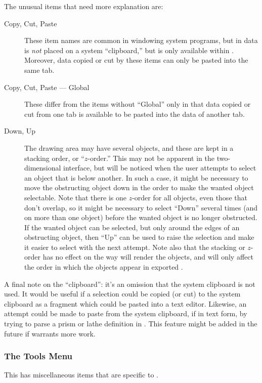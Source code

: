 			The unusual items that need more explanation are:
			\begin{description}
			  \item[Copy, Cut, Paste] These item names are common
			  in windowing system programs, but in \IXpkg{} data
			  is \emph{not} placed on a system ``clipboard,'' but
			  is only available within \IXpkg. Moreover, data
			  copied or cut by these items can only be pasted into
			  the same tab.
			  \item[Copy, Cut, Paste --- Global] These differ from
			  the items without ``Global'' only in that data
			  copied or cut from one tab is available to be pasted
			  into the data of another tab.
			  \item[Down, Up] The drawing area may have several
			  objects, and these are kept in a stacking order, or
			  ``$z$-order.'' This may not be apparent in the
			  two-dimensional interface, but will be noticed when
			  the user attempts to select an object that is below
			  another. In such a case, it might be necessary
			  to move the obstructing object down in the order
			  to make the wanted object selectable. Note that
			  there is one $z$-order for all objects, even
			  those that don't overlap, so it might be necessary
			  to select ``Down'' several times (and on more
			  than one object) before the wanted
			  object is no longer obstructed. If the wanted object
			  can be selected, but only around the edges of an
			  obstructing object, then ``Up'' can be used to
			  raise the selection and make it easier to select
			  with the next attempt. Note also that the
			  stacking or $z$-order has no effect on the way
			  \IXpov{} will render the objects, and will only affect
			  the order in which the objects appear in exported
			  .
			\end{description}
			
			A final note on the ``clipboard'': it's an omission
			that the system clipboard is not used. It would be
			useful if a selection could be copied (or cut) to
			the system clipboard as a  fragment
			which could be pasted into a text editor. Likewise,
			an attempt could be made to paste from the system
			clipboard, if in text form, by trying to parse a
			prism or lathe definition in . This
			feature might be added in the future if \IXpkg{}
			warrants more work.

			\subsubsection{The Tools Menu}%
			\label{sssec:tools_menu}
			This  has miscellaneous items that
			are specific to \IXpkg.


